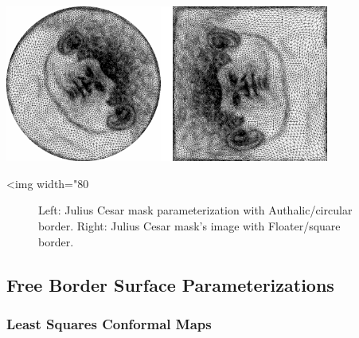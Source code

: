   \\
  \\
  \\
  \\

\begin{center}
    \label{Surface_mesh_parameterization-fig-circular_border}
    \begin{ccTexOnly}
        \includegraphics[width=0.80\textwidth]{Surface_mesh_parameterization/border}
    \end{ccTexOnly}
    \begin{ccHtmlOnly}
        <img width="80%
    \end{ccHtmlOnly}
    \begin{figure}[h]
        \caption{Left: Julius Cesar mask parameterization with
                 Authalic/circular border. Right: Julius Cesar mask's
                 image with Floater/square border.}
    \end{figure}
\end{center}



\subsection{Free Border Surface Parameterizations}

\subsubsection{Least Squares Conformal Maps}

  \\

